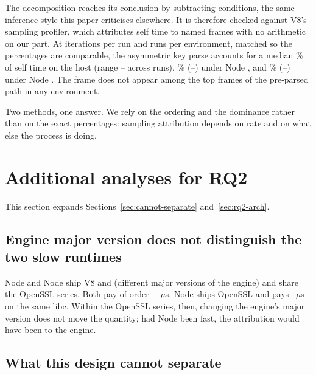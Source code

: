 \documentclass[preprint,12pt,authoryear]{elsarticle}
\begin{document}
The decomposition reaches its conclusion by subtracting conditions, the same
inference style this paper criticises elsewhere. It is therefore checked against
V8's sampling profiler, which attributes self time to named frames with no
arithmetic on our part. At \ProfIterations{} iterations per run and
\ProfRepeats{} runs per environment, matched so the percentages are comparable,
the asymmetric key parse accounts for a median \ProfHostPct\% of self time on
the host (range \ProfHostPctLo--\ProfHostPctHi{} across runs),
\ProfEighteenPct\% (\ProfEighteenPctLo--\ProfEighteenPctHi) under Node
\NodeEighteenNodeMajor, and \ProfTwentySixPct\%
(\ProfTwentySixPctLo--\ProfTwentySixPctHi) under Node
\NodeTwentySixMuslNodeMajor. The frame does not appear among the top frames of
the pre-parsed path in any environment.

Two methods, one answer. We rely on the ordering and the dominance rather than on
the exact percentages: sampling attribution depends on rate and on what else the
process is doing.


\section{Additional analyses for RQ2}

This section expands Sections~\ref{sec:cannot-separate} and~\ref{sec:rq2-arch}.


\subsection{Engine major version does not distinguish the two slow runtimes}

Node \NodeEighteenNodeMajor{} and Node \NodeTwentyNodeMajor{} ship V8
\NodeEighteenVeight{} and \NodeTwentyVeight{} (different major versions of the
engine) and share the OpenSSL \NodeEighteenOpensslSeries{} series. Both pay of
order \NodeEighteenProbeThrows--\NodeTwentyProbeThrows~$\mu$s. Node
\NodeTwentySixMuslNodeMajor{} ships OpenSSL \NodeTwentySixMuslOpensslSeries{} and
pays \NodeTwentySixMuslProbeThrows~$\mu$s on the same libc. Within the OpenSSL
\NodeEighteenOpensslSeries{} series, then, changing the engine's major version
does not move the quantity; had Node \NodeTwentyNodeMajor{} been fast, the
attribution would have been to the engine.

\subsection{What this design cannot separate}
\end{document}
